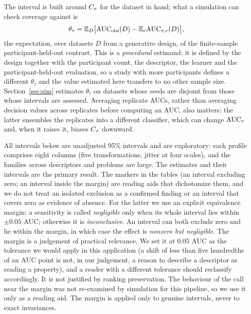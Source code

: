 The interval is built around $C_\tau$ for the dataset in hand; what a simulation can check coverage against is
\begin{equation}
\theta_\tau = \mathbb{E}_D\big[\mathrm{AUC}_{\mathrm{obs}}(D) - \mathbb{E}_r \mathrm{AUC}_{\tau,r}(D)\big],
\label{eq:estimand}
\end{equation}
the expectation, over datasets $D$ from a generative design, of the finite-sample participant-held-out contrast. This is a \emph{procedural} estimand: it is defined by the design together with the participant count, the descriptor, the learner and the participant-held-out evaluation, so a study with more participants defines a different $\theta_\tau$ and the value estimated here transfers to no other sample size. Section~\ref{sec:sim} estimates $\theta_\tau$ on datasets whose seeds are disjoint from those whose intervals are assessed. Averaging replicate AUCs, rather than averaging decision values across replicates before computing an AUC, also matters: the latter ensembles the replicates into a different classifier, which can change $\mathrm{AUC}_\tau$ and, when it raises it, biases $C_\tau$ downward.

All intervals below are unadjusted 95\% intervals and are exploratory: each profile comprises eight columns (five transformations, jitter at four scales), and the families across descriptors and problems are large. The estimates and their intervals are the primary result. The markers in the tables (an interval excluding zero; an interval inside the margin) are reading aids that dichotomize them, and we do not treat an isolated exclusion as a confirmed finding or an interval that covers zero as evidence of absence. For the latter we use an explicit equivalence margin: a sensitivity is called \emph{negligible} only when its whole interval lies within $\pm 0.05$ AUC; otherwise it is \emph{inconclusive}. An interval can both exclude zero and lie within the margin, in which case the effect is \emph{nonzero but negligible}. The margin is a judgement of practical relevance. We set it at $0.05$ AUC as the tolerance we would apply in this application (a shift of less than five hundredths of an AUC point is not, in our judgement, a reason to describe a descriptor as reading a property), and a reader with a different tolerance should reclassify accordingly. It is not justified by ranking preservation. The behaviour of the call near the margin was not re-examined by simulation for this pipeline, so we use it only as a reading aid. The margin is applied only to genuine intervals, never to exact invariances.

